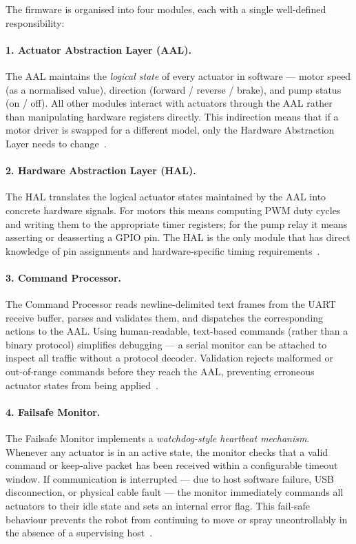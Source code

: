 The firmware is organised into four modules, each with a single
well-defined responsibility:
 
\paragraph{1. Actuator Abstraction Layer (AAL).}
The AAL maintains the \emph{logical state} of every actuator in
software — motor speed (as a normalised value), direction (forward /
reverse / brake), and pump status (on / off). All other modules
interact with actuators through the AAL rather than manipulating
hardware registers directly. This indirection means that if a motor
driver is swapped for a different model, only the Hardware Abstraction
Layer needs to change~\cite{gamma1994design}.
 
\paragraph{2. Hardware Abstraction Layer (HAL).}
The HAL translates the logical actuator states maintained by the AAL
into concrete hardware signals. For motors this means computing PWM
duty cycles and writing them to the appropriate timer registers; for
the pump relay it means asserting or deasserting a GPIO pin. The HAL
is the only module that has direct knowledge of pin assignments and
hardware-specific timing requirements~\cite{heath2002embedded}.
 
\paragraph{3. Command Processor.}
The Command Processor reads newline-delimited text frames from the
UART receive buffer, parses and validates them, and dispatches the
corresponding actions to the AAL. Using human-readable, text-based
commands (rather than a binary protocol) simplifies debugging — a
serial monitor can be attached to inspect all traffic without a
protocol decoder. Validation rejects malformed or out-of-range
commands before they reach the AAL, preventing erroneous actuator
states from being applied~\cite{axelson2007serial}.
 
\paragraph{4. Failsafe Monitor.}
The Failsafe Monitor implements a \emph{watchdog-style heartbeat
mechanism}. Whenever any actuator is in an active state, the monitor
checks that a valid command or keep-alive packet has been received
within a configurable timeout window. If communication is interrupted
— due to host software failure, USB disconnection, or physical cable
fault — the monitor immediately commands all actuators to their idle
state and sets an internal error flag. This fail-safe behaviour
prevents the robot from continuing to move or spray uncontrollably in
the absence of a supervising host~\cite{kopetz2011real}.
 
